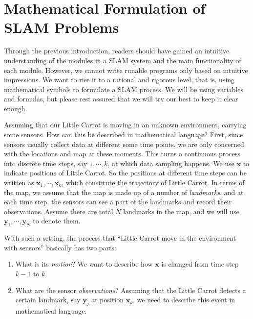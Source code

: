 \section{Mathematical Formulation of SLAM Problems}
Through the previous introduction, readers should have gained an intuitive understanding of the modules in a SLAM system and the main functionality of each module. However, we cannot write runable programs only based on intuitive impressions. We want to rise it to a rational and rigorous level, that is, using mathematical symbols to formulate a SLAM process. We will be using variables and formulas, but please rest assured that we will try our best to keep it clear enough.

Assuming that our Little Carrot is moving in an unknown environment, carrying some sensors. How can this be described in mathematical language? First, since sensors usually collect data at different some time points, we are only concerned with the locations and map at these moments. This turns a continuous process into discrete time steps, say $1, \cdots, k$, at which data sampling happens. We use $\mathbf{x}$ to indicate positions of Little Carrot. So the positions at different time steps can be written as $\mathbf{x}_1,\cdots,\mathbf{x}_k$, which constitute the trajectory of Little Carrot. In terms of the map, we assume that the map is made up of a number of \emph{landmarks}, and at each time step, the sensors can see a part of the landmarks and record their observations. Assume there are total $N$ landmarks in the map, and we will use $\mathbf{y}_1, \cdots, \mathbf{y}_N$ to denote them.

With such a setting, the process that ``Little Carrot move in the environment with sensors'' basically has two parts: 

\begin{enumerate}
\item What is its \emph{motion}? We want to describe how $\mathbf{x}$ is changed from time step $k-1$ to $k$.
\item What are the sensor \emph{observations}? Assuming that the Little Carrot detects a certain landmark, say $\mathbf{y}_j$ at position $\mathbf{x}_k$, we need to describe this event in mathematical language.
\end{enumerate}

